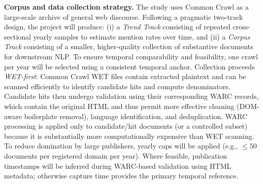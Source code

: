\documentclass[12pt,letterpaper]{article}
\begin{document}
	\textbf{Corpus and data collection strategy.} The study uses Common Crawl as a large-scale archive of general web discourse. Following a pragmatic two-track design, the project will produce: (i) a \emph{Trend Track} consisting of repeated cross-sectional yearly samples to estimate mention rates over time, and (ii) a \emph{Corpus Track} consisting of a smaller, higher-quality collection of substantive documents for downstream NLP. To ensure temporal comparability and feasibility, one crawl per year will be selected using a consistent temporal anchor. Collection proceeds \emph{WET-first}: Common Crawl WET files contain extracted plaintext and can be scanned efficiently to identify candidate hits and compute denominators. Candidate hits then undergo validation using their corresponding WARC records, which contain the original HTML and thus permit more effective cleaning (DOM-aware boilerplate removal), language identification, and deduplication. WARC processing is applied only to candidate/hit documents (or a controlled subset) because it is substantially more computationally expensive than WET scanning. To reduce domination by large publishers, yearly caps will be applied (e.g., $\leq 50$ documents per registered domain per year). Where feasible, publication timestamps will be inferred during WARC-based validation using HTML metadata; otherwise capture time provides the primary temporal reference.
	
\end{document}
